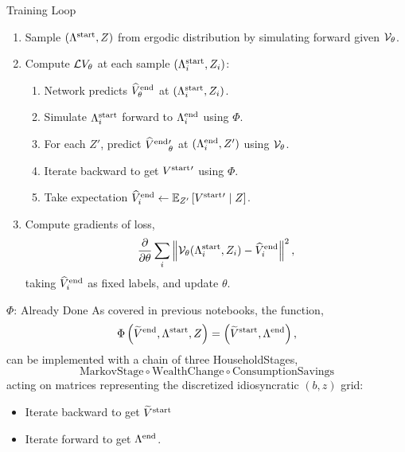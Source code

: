 \documentclass[10pt,aspectratio=169]{beamer}
\begin{document}
\begin{frame}{Training Loop}
  \begin{enumerate}
    \item Sample $(\Lambda^{\mathrm{start}}, Z)$ from ergodic distribution by simulating forward given $\mathcal{V}_\theta$.
    \item Compute $\mathcal{L} V_\theta$ at each sample $(\Lambda^{\mathrm{start}}_i, Z_i)$:
    \begin{enumerate}
      \item Network predicts $\widehat{V}^{\mathrm{end}}_\theta$ at $(\Lambda^{\mathrm{start}}_i, Z_i)$.
      \item Simulate $\Lambda^{\mathrm{start}}_i$ forward to $\Lambda^{\mathrm{end}}_i$ using $\Phi$.
      \item For each $Z'$, predict $\widehat{V}^{\mathrm{end}}{}'_\theta$ at $(\Lambda^{\mathrm{end}}_i, Z')$ using $\mathcal{V}_\theta$.
      \item Iterate backward to get $V^{\mathrm{start}}{}'$ using $\Phi$.
      \item Take expectation $\widehat{V}^{\mathrm{end}}_i \leftarrow \mathbb{E}_{Z'}\left[ V^{\mathrm{start}}{}'\mid Z \right]$.
    \end{enumerate}
    \item Compute gradients of loss,
    \[
      \frac{\partial}{\partial\theta}\sum_i\left\| \mathcal{V}_\theta(\Lambda^{\mathrm{start}}_i, Z_i) - \widehat{V}^{\mathrm{end}}_i \right\|^2,
    \]
    taking $\widehat{V}^{\mathrm{end}}_i$ as fixed labels, and update $\theta$.
  \end{enumerate}
\end{frame}

\begin{frame}{$\Phi$: Already Done}
  As covered in previous notebooks, the function,
  \[
    \Phi\left( \widetilde{V}^{\mathrm{end}}, \Lambda^{\mathrm{start}}, Z \right) = \left( \widetilde{V}^{\mathrm{start}}, \Lambda^{\mathrm{end}} \right),
  \]
  can be implemented with a chain of three HouseholdStages,
  \[
    \text{MarkovStage}\circ\text{WealthChange}\circ\text{ConsumptionSavings}
  \]
  acting on matrices representing the discretized idiosyncratic $(b, z)$ grid:
  \begin{itemize}
    \item Iterate backward to get $\widetilde{V}^{\mathrm{start}}$
    \item Iterate forward to get $\Lambda^{\mathrm{end}}$.
  \end{itemize}
\end{frame}
\end{document}
